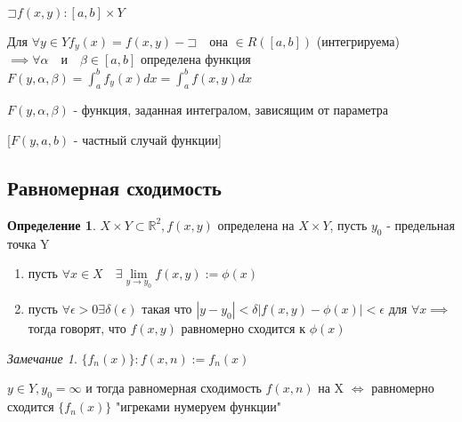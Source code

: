 \documentclass[a4paper, 12pt]{article}
\newcommand\letsymbol{\mathord{\sqsupset}}
\theoremstyle{definition}
\newtheorem*{definition}{Определение}
\theoremstyle{remark}
\newtheorem*{remark}{Замечание}
\begin{document}
$\letsymbol f(x,y): [a, b]\times Y$

Для $\forall y \in Y f_y(x) = f(x,y) - \letsymbol\quad$она $\in R([a, b])$ (интегрируема)
$\implies \forall \alpha\quad$и$\quad\beta\in[a,b]$ определена функция $F(y, \alpha, \beta) = \int_{a}^{b} f_y(x)dx = \int_{a}^{b} f(x, y)dx$

$F(y, \alpha, \beta)$ - функция, заданная интегралом, зависящим от параметра

[$F(y, a, b)$ - частный случай функции]

\subsection{Равномерная сходимость}

\begin{definition}
     $X\times Y \subset \mathbb{R}^2, f(x,y)$ определена на $X\times Y$, пусть $y_0$ - предельная точка Y
\begin{enumerate}
     \item пусть $\forall x \in X \quad \exists \lim\limits_{y\to y_0}f(x,y):=\phi(x)$
     \item пусть $\forall \epsilon >0 \exists \delta(\epsilon)$ такая что $|y - y_0|<\delta |f(x,y) - \phi(x)|< \epsilon$ для $\forall x \implies$ тогда говорят, что $f(x,y)$ равномерно сходится к $\phi(x)$ 
   \end{enumerate}
\end{definition}

\begin{remark}
     $\{f_n(x)\} : f(x, n) :=f_n(x)$

$y \in Y, y_0 = \infty$ и тогда равномерная сходимость $f(x,n)$ на X $\iff$ равномерно сходится $\{f_n(x)\}$ "игреками нумеруем функции"

\end{remark}
\end{document}
